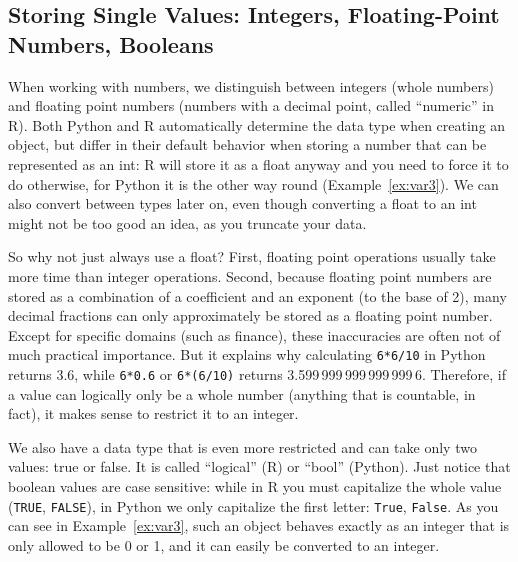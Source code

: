 



\subsection{Storing Single Values: Integers, Floating-Point Numbers, Booleans}\label{sec:primitives}

 When working with numbers, we distinguish between integers (whole
numbers) and floating point numbers (numbers with a decimal point,
called ``numeric'' in R). Both Python and R automatically determine the
data type when creating an object, but differ in their default
behavior when storing a number that can be represented as an int: R
will store it as a float anyway and you need to force it to do
otherwise, for Python it is the other way round
(Example~\ref{ex:var3}). We can also convert between types later on,
even though converting a float to an int might not be too good an idea,
as you truncate your data.

So why not just always use a float? First,
floating point operations usually take more time than integer operations.
Second, because floating point numbers are stored as a combination of
a coefficient and an exponent (to the base of 2), many decimal fractions can only approximately be stored
as a floating point number. Except for specific domains (such
as finance), these inaccuracies are often not of much practical importance.
But it explains why calculating \verb|6*6/10| in Python returns 3.6, while
\verb|6*0.6| or \verb|6*(6/10)| returns 3.599\,999\,999\,999\,999\,6. Therefore, if
a value can logically only be a whole number (anything that is
countable, in fact), it makes sense to restrict it to an integer.

We also have a data type that is even more restricted and can take
only two values: true or false. It is called ``logical'' (R) or ``bool''
(Python).  Just notice that boolean values are case sensitive:
while in R you must capitalize the whole value (\verb|TRUE|, \verb|FALSE|), in
Python we only capitalize the first letter: \verb|True|, \verb|False|.  As you can
see in Example~\ref{ex:var3}, such an object behaves exactly as an integer that
is only allowed to be 0 or 1, and it can easily be converted to an
integer.





